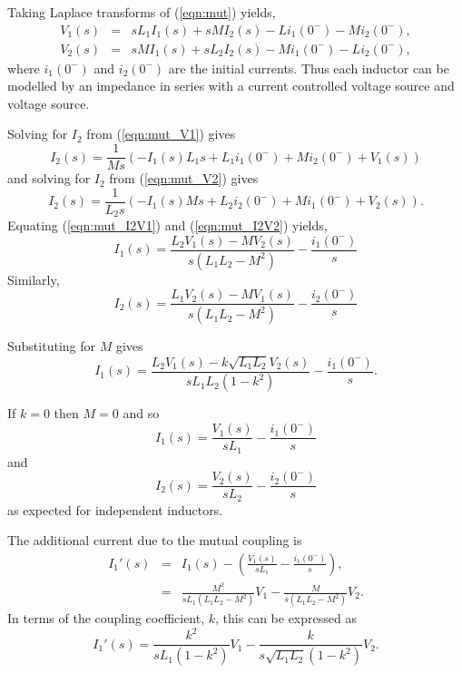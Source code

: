 \documentclass[a4paper, 12pt]{article}
\newcommand{\encp}[1]{\left(#1\right)}
\newcommand{\refeqn}[1]{\mbox{(\ref{eqn:#1})}}
\begin{document}
Taking Laplace transforms of \refeqn{mut} yields,
%
\begin{eqnarray}
\label{eqn:mut_V1}
 V_1(s) & = & s L_1 I_1(s) + s M I_2(s) - L i_1(0^{-}) - M i_2(0^{-}), \\
 V_2(s) & = & s M I_1(s) + s L_2 I_2(s) - M i_1(0^{-}) - L i_2(0^{-}),
\label{eqn:mut_V2}
\end{eqnarray}
%
where $i_1(0^{-})$ and $i_2(0^{-})$ are the initial currents.
Thus each inductor can be modelled by an impedance in series with a
current controlled voltage source and voltage source.

Solving for $I_2$ from \refeqn{mut_V1} gives
%
\begin{equation} 
  I_2(s) = \frac{1}{M s} \left(- I_1(s) L_1 s + L_1 i_1(0^{-}) + M i_2(0^{-}) + V_1(s)\right)
\label{eqn:mut_I2V1}
\end{equation}
%
and solving for $I_2$ from \refeqn{mut_V2} gives
%
\begin{equation}
I_2(s) = \frac{1}{L_2 s} \left(- I_1(s) M s + L_2 i_2(0^{-}) + M i_1(0^{-}) + V_2(s)\right).
\label{eqn:mut_I2V2}
\end{equation}
%
Equating \refeqn{mut_I2V1} and \refeqn{mut_I2V2} yields,
%
\begin{equation}
I_1(s) =\frac{L_2 V_1(s) - M V_2(s)}{s \left(L_1 L_2 - M^{2}\right)}
- \frac{i_1(0^{-})}{s}
 \end{equation}
%
Similarly,
%
\begin{equation}
I_2(s) =\frac{L_1 V_2(s) - M V_1(s)}{s \left(L_1 L_2 - M^{2}\right)}
- \frac{i_2(0^{-})}{s}
 \end{equation}


Substituting for $M$ gives
%
\begin{equation}
I_1(s) =\frac{L_2 V_1(s) - k\sqrt{L_1 L_2} V_2(s)}{s L_1 L_2 \left(1 - k^2\right)}
- \frac{i_1(0^{-})}{s}.
 \end{equation}



If $k=0$ then $M=0$ and so
%
\begin{equation}
I_1(s) = \frac{V_1(s)}{s L_1} - \frac{i_1(0^{-})}{s}
 \end{equation}
%
and
%
\begin{equation}
I_2(s) = \frac{V_2(s)}{s L_2} - \frac{i_2(0^{-})}{s}
\end{equation}
%
as expected for independent inductors.


The additional current due to the mutual coupling is
%
\begin{eqnarray}
  I_1'(s) & = & I_1(s) - \encp{\frac{V_1(s)}{s L_1} - \frac{i_1(0^{-})}{s}}, \\
          & = & \frac{M^2}{s L_1 \encp{L_1 L_2 - M^2}} V_1 - \frac{M}{s \encp{L_1 L_2 - M^2}} V_2.
\end{eqnarray}
%
In terms of the coupling coefficient, $k$, this can be expressed as
%
\begin{equation}
  I_1'(s) = \frac{k^2}{s L_1 \encp{1-k^2}} V_1 - \frac{k}{s\sqrt{L_1 L_2}\encp{1-k^2}}V_2.
\end{equation}
\end{document}
